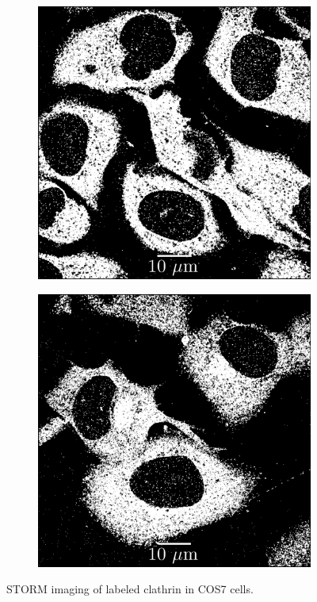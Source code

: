 \begin{figure}
\begin{subfigure}{0.32\textwidth}
        \includegraphics[width=\textwidth]{figures/clathrin_image12.png}
        \caption{}
        \label{fig:clathrin_image4}
    \end{subfigure}
    \begin{subfigure}{0.32\textwidth}
        \includegraphics[width=\textwidth]{figures/clathrin_image2.png}
        \caption{}
        \label{fig:clathrin_image6}
    \end{subfigure}
    \caption{STORM imaging of labeled clathrin in COS7 cells.}
    \label{fig:clathrin_images}
\end{figure}